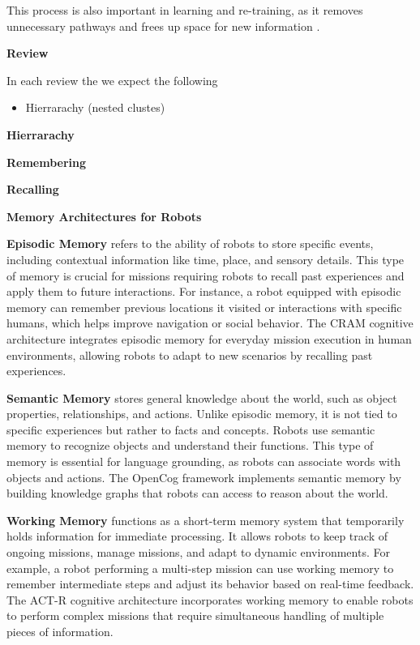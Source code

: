 \documentclass{book}
\providecommand{\ProjectDeepHeading}[2]{%
    \par\medskip\noindent\textbf{#2}\par\smallskip
}
\begin{document}
        This process is also important in learning and re-training, as it removes unnecessary pathways and frees up space for new information .



    \ProjectDeepHeading{7}{Review}
        In each review the we expect the following
        \begin{itemize}
            \item Hierrarachy (nested clustes)
        \end{itemize}
        \ProjectDeepHeading{8}{Hierrarachy}


    \ProjectDeepHeading{7}{Remembering}

    \ProjectDeepHeading{7}{Recalling}




    \ProjectDeepHeading{7}{Memory Architectures for Robots}
        \textbf{Episodic Memory} refers to the ability of robots to store specific events, including contextual information like time, place, and sensory details. This type of memory is crucial for missions requiring robots to recall past experiences and apply them to future interactions. For instance, a robot equipped with episodic memory can remember previous locations it visited or interactions with specific humans, which helps improve navigation or social behavior. The CRAM cognitive architecture integrates episodic memory for everyday mission execution in human environments, allowing robots to adapt to new scenarios by recalling past experiences.
    
        \textbf{Semantic Memory} stores general knowledge about the world, such as object properties, relationships, and actions. Unlike episodic memory, it is not tied to specific experiences but rather to facts and concepts. Robots use semantic memory to recognize objects and understand their functions. This type of memory is essential for language grounding, as robots can associate words with objects and actions. The OpenCog framework implements semantic memory by building knowledge graphs that robots can access to reason about the world.
    
        \textbf{Working Memory} functions as a short-term memory system that temporarily holds information for immediate processing. It allows robots to keep track of ongoing missions, manage missions, and adapt to dynamic environments. For example, a robot performing a multi-step mission can use working memory to remember intermediate steps and adjust its behavior based on real-time feedback. The ACT-R cognitive architecture incorporates working memory to enable robots to perform complex missions that require simultaneous handling of multiple pieces of information.
    
\end{document}
